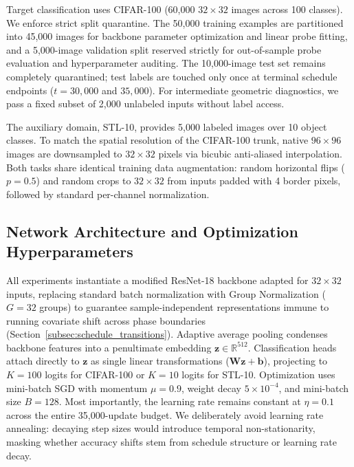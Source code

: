 \documentclass[sn-mathphys,Numbered]{sn-jnl}
\begin{document}
Target classification uses CIFAR-100 (60{,}000 $32 \times 32$ images across 100 classes). We enforce strict split quarantine. The 50{,}000 training examples are partitioned into 45{,}000 images for backbone parameter optimization and linear probe fitting, and a 5{,}000-image validation split reserved strictly for out-of-sample probe evaluation and hyperparameter auditing. The 10{,}000-image test set remains completely quarantined; test labels are touched only once at terminal schedule endpoints ($t = 30{,}000$ and $35{,}000$). For intermediate geometric diagnostics, we pass a fixed subset of 2{,}000 unlabeled inputs without label access.

The auxiliary domain, STL-10, provides 5{,}000 labeled images over 10 object classes. To match the spatial resolution of the CIFAR-100 trunk, native $96 \times 96$ images are downsampled to $32 \times 32$ pixels via bicubic anti-aliased interpolation. Both tasks share identical training data augmentation: random horizontal flips ($p = 0.5$) and random crops to $32 \times 32$ from inputs padded with 4 border pixels, followed by standard per-channel normalization.

\subsection{Network Architecture and Optimization Hyperparameters}\label{subsec:protocol_model}

All experiments instantiate a modified ResNet-18 backbone \cite{he2016deep} adapted for $32 \times 32$ inputs, replacing standard batch normalization with Group Normalization ($G = 32$ groups) \cite{wu2018groupnorm} to guarantee sample-independent representations immune to running covariate shift across phase boundaries (Section~\ref{subsec:schedule_transitions}). Adaptive average pooling condenses backbone features into a penultimate embedding $\bm{z} \in \mathbb{R}^{512}$. Classification heads attach directly to $\bm{z}$ as single linear transformations ($\bm{W}\bm{z} + \bm{b}$), projecting to $K = 100$ logits for CIFAR-100 or $K = 10$ logits for STL-10. Optimization uses mini-batch SGD with momentum $\mu = 0.9$, weight decay $5 \times 10^{-4}$, and mini-batch size $B = 128$. Most importantly, the learning rate remains constant at $\eta = 0.1$ across the entire 35{,}000-update budget. We deliberately avoid learning rate annealing: decaying step sizes would introduce temporal non-stationarity, masking whether accuracy shifts stem from schedule structure or learning rate decay.
\end{document}
